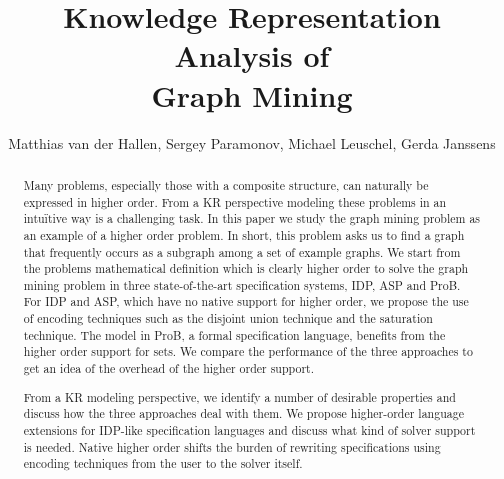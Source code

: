 \documentclass{new_tlp}
\author[]{Matthias van der Hallen, Sergey Paramonov, Michael Leuschel, Gerda Janssens}
\title{Knowledge Representation Analysis of\\ Graph Mining}
\begin{document}
\maketitle
\begin{abstract}
Many problems, especially those with a composite structure, can naturally be expressed in higher order. %
From a KR perspective modeling these problems in an intu\"itive way is a challenging task.
In this paper we study the graph mining problem as an example of a higher order problem. 
In short, this problem asks us to find a graph that frequently occurs as a subgraph among a set of example graphs.
We start from the problems mathematical definition which is clearly higher
order to solve the graph mining problem in three state-of-the-art specification
systems, IDP, ASP and ProB.
For IDP and ASP, which have no
native support for higher order, we propose the use of encoding
techniques such as the disjoint union technique and the saturation technique.
The model in ProB, a formal specification language, benefits
from the higher order support for sets.
We compare the performance of the three approaches to get an idea of
the overhead of the higher order support.

From a KR modeling perspective, we identify a number of desirable
properties and discuss how the three approaches deal with them.
We propose higher-order language extensions for IDP-like
specification languages
and  discuss what kind of solver support is needed.
Native higher order shifts the burden of rewriting specifications using encoding techniques from the user to the solver itself.


\end{abstract}


%




%


{\tiny
}



\end{document}
